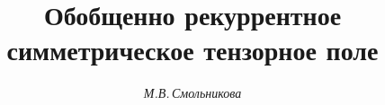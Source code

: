




%





\newcommand{\trace}{\operatorname{trace}}


\newcommand{\Ric}{\operatorname{Ric}}


\newcommand{\Div}{\operatorname{div}}


\newcommand{\const}{\operatorname{const}}


\newcommand{\tts}[1]{}









\setcounter{page}{48}















\author{\it М.В.\,Смольникова}




\title{Обобщенно рекуррентное\\


симметрическое тензорное поле}





\date{}




\pagestyle{plain} %







